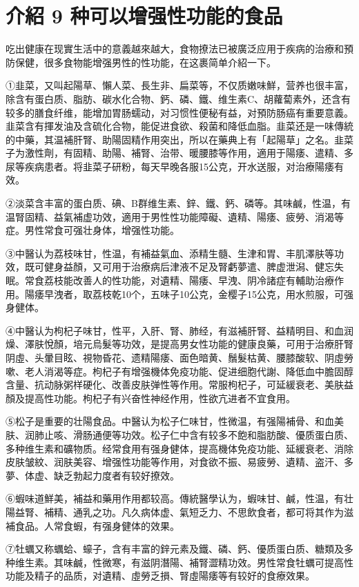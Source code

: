 \documentclass[12pt,UTF8]{ctexbook}
\begin{document}
\section{介紹 9 种可以增强性功能的食品}

吃出健康在现實生活中的意義越來越大，食物撩法已被廣泛应用于疾病的治療和預防保健，很多食物能增强男性的性功能，在这裹简单介紹一下。

①韭菜，又叫起陽草、懶人菜、長生非、扁菜等，不仅质嫩味鮮，营养也很丰富，除含有蛋白质、脂肪、碳水化合物、鈣、磷、鐵、维生素C、胡蘿蔔素外，还含有较多的膳食纤维，能增加胃肠蠕动，对习惯性便秘有益，对預防肠癌有重要意義。韭菜含有揮发油及含硫化合物，能促进食欲、殺菌和降低血脂。韭菜还是一味傳統的中藥，其温補肝腎、助陽固精作用突出，所以在藥典上有「起陽草」之名。韭菜子为激性劑，有固精、助陽、補腎、治带、暖腰膝等作用，適用于陽痿、遣精、多尿等疾病患者。将韭菜子研粉，每天早晚各服15公克，开水送服，对治療陽痿有效。

②淡菜含丰富的蛋白质、碘、B群维生素、鋅、鐵、鈣、磷等。其味鹹，性温，有温腎固精、益氣補虚功效，適用于男性性功能障礙、遺精、陽痿、疲勞、消渴等症。男性常食可强壮身体，增强性功能。

③中醫认为荔枝味甘，性温，有補益氣血、添精生髓、生津和胃、丰肌澤肤等功效，既可健身益顏，又可用于治療病后津液不足及腎虧夢遣、脾虚泄潟、健忘失眠。常食荔枝能改善人的性功能，对遺精、陽痿、早洩、阴冷諸症有輔助治療作用。陽痿早洩者，取荔枝乾10个，五味子10公克，金樱子15公克，用水煎服，可强身健体。

④中醫认为枸杞子味甘，性平，入肝、腎、肺经，有滋補肝腎、益精明目、和血润燥、澤肤悅顏，培元烏髮等功效，是提高男女性功能的健康良藥，可用于治療肝腎阴虛、头暈目眩、視物昏花、遗精陽痿、面色暗黄、鬚髮枯黄、腰膝酸软、阴虛勞嗽、老人消渴等症。枸杞子有增强機体免疫功能、促进细胞代謝、降低血中膽固醇含量、抗动脉粥样硬化、改善皮肤弹性等作用。常服枸杞子，可延緩衰老、美肤益顏及提高性功能。枸杞子有兴奋性神经作用，性欲亢进者不宜食用。

⑤松子是重要的壮陽食品。中醫认为松子仁味甘，性微温，有强陽補骨、和血美肤、润肺止咳、滑肠通便等功效。松子仁中含有较多不飽和脂肪酸、優质蛋白质、多种维生素和礦物质。经常食用有强身健体，提高機体免疫功能、延緩衰老、消除皮肤皱紋、润肤美容、增强性功能等作用，对食欲不振、易疲勞、遺精、盗汗、多夢、体虚、缺乏勃起力度者有较好撩效。

⑥蝦味道鮮美，補益和藥用作用都较高。傳統醫學认为，蝦味甘、鹹，性温，有壮陽益腎、補精、通乳之功。凡久病体虚、氣短乏力、不思飲食者，都可将其作为滋補食品。人常食蝦，有强身健体的效果。

⑦牡蠣又称蠣蛤、蠔子，含有丰富的鋅元素及鐵、磷、鈣、優质蛋白质、糖類及多种维生素。其味鹹，性微寒，有滋阴潛陽、補腎澀精功效。男性常食牡蠣可提高性功能及精子的品质，对遺精、虛勞乏損、腎虛陽痿等有较好的食療效果。
\end{document}

